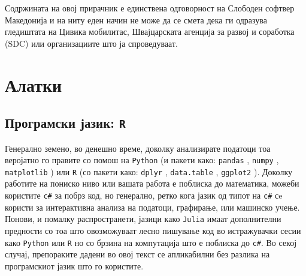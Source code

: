 \documentclass[
]{book}
\begin{document}
Содржината на овој прирачник е единствена одговорност на Слободен софтвер Македонија и на ниту еден начин не може да се смета дека ги одразува гледиштата на Цивика мобилитас, Швајцарската агенција за развој и соработка (SDC) или организациите што ја спроведуваат.

\hypertarget{tools}{%
\chapter{Алатки}\label{tools}}

\hypertarget{ux43fux440ux43eux433ux440ux430ux43cux441ux43aux438-ux458ux430ux437ux438ux43a-r}{%
\section{\texorpdfstring{Програмски јазик: \texttt{R}}{Програмски јазик: R}}\label{ux43fux440ux43eux433ux440ux430ux43cux441ux43aux438-ux458ux430ux437ux438ux43a-r}}

Генерално земено, во денешно време, доколку анализирате податоци тоа веројатно го правите со помош на \texttt{Python} \citep{rossum1995python} (и пакети како: \texttt{pandas} \citep{mckinney2011pandas}, \texttt{numpy} \citep{harris2020array}, \texttt{matplotlib} \citep{barrett2005matplotlib}) или \texttt{R} \citep{R} (со пакети како: \texttt{dplyr} \citep{R-dplyr}, \texttt{data.table} \citep{R-data.table}, \texttt{ggplot2} \citep{R-ggplot2}). Доколку работите на пониско ниво или вашата работа е поблиска до математика, можеби користите \texttt{c\#} за побрз код, но генерално, ретко кога јазик од типот на \texttt{c\#} сe користи за интерактивна анализа на податоци, графирање, или машинско учење. Понови, и помалку распространети, јазици како \texttt{Julia} \citep{bezanson2017julia} имаат дополнителни предности со тоа што овозможуваат лесно пишување код во истражувачки сесии како \texttt{Python} или \texttt{R} но со брзина на компутација што е поблиска до \texttt{c\#}. Во секој случај, препораките дадени во овој текст се апликабилни без разлика на програмскиот јазик што го користите.
\end{document}
